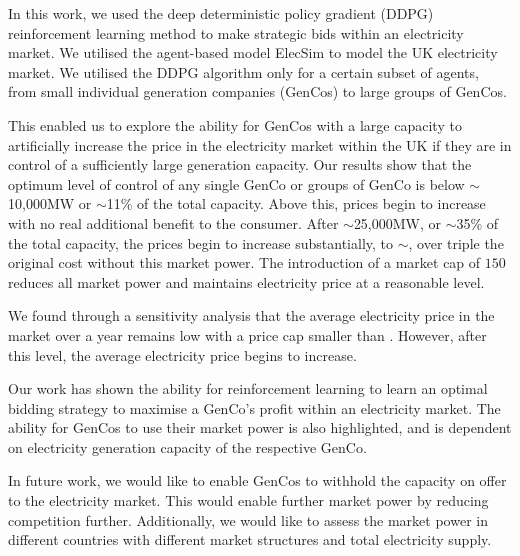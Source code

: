 In this work, we used the deep deterministic policy gradient (DDPG) reinforcement learning method to make strategic bids within an electricity market. We utilised the agent-based model ElecSim to model the UK electricity market. We utilised the DDPG algorithm only for a certain subset of agents, from small individual generation companies (GenCos) to large groups of GenCos. 

This enabled us to explore the ability for GenCos with a large capacity to artificially increase the price in the electricity market within the UK if they are in control of a sufficiently large generation capacity. Our results show that the optimum level of control of any single GenCo or groups of GenCo is below ${\sim}$10,000MW or ${\sim}$11\% of the total capacity. Above this, prices begin to increase with no real additional benefit to the consumer. After ${\sim}$25,000MW, or ${\sim}$35\% of the total capacity, the prices begin to increase substantially, to ${\sim}$, over triple the original cost without this market power. The introduction of a market cap of \textsterling$150$ reduces all market power and maintains electricity price at a reasonable level.

We found through a sensitivity analysis that the average electricity price in the market over a year remains low with a price cap smaller than . However, after this level, the average electricity price begins to increase.


Our work has shown the ability for reinforcement learning to learn an optimal bidding strategy to maximise a GenCo's profit within an electricity market. The ability for GenCos to use their market power is also highlighted, and is dependent on electricity generation capacity of the respective GenCo.

In future work, we would like to enable GenCos to withhold the capacity on offer to the electricity market. This would enable further market power by reducing competition further.  Additionally, we would like to assess the market power in different countries with different market structures and total electricity supply.

